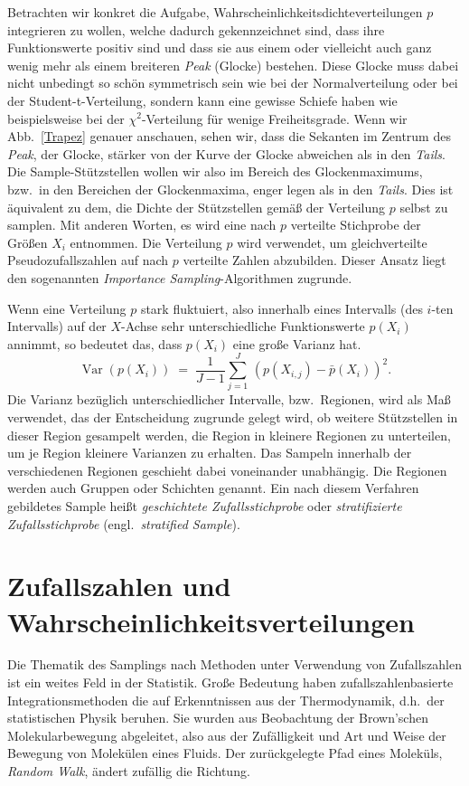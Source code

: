 Betrachten wir konkret die Aufgabe, Wahrscheinlichkeitsdichteverteilungen $p$
integrieren zu wollen, welche dadurch gekennzeichnet sind, dass ihre Funktionswerte
positiv sind und dass sie aus einem
oder vielleicht auch ganz wenig mehr als einem breiteren \textsl{Peak} (Glocke) bestehen.
Diese Glocke muss dabei nicht unbedingt so schön symmetrisch sein wie bei der 
Normalverteilung oder bei der Student-t-Verteilung, sondern kann eine gewisse Schiefe haben
wie beispielsweise bei der $\chi^2$-Verteilung für wenige Freiheitsgrade.
Wenn wir Abb.~\ref{Trapez} genauer anschauen, sehen wir, dass die Sekanten im Zentrum
des \textsl{Peak}, der Glocke, stärker von der Kurve der Glocke abweichen als in den
\textsl{Tails}. Die Sample-Stützstellen wollen wir also im Bereich des Glockenmaximums, bzw.\
in den Bereichen der Glockenmaxima, enger legen als in den \textsl{Tails}. Dies ist äquivalent
zu dem, die Dichte der Stützstellen gemäß der Verteilung $p$ selbst zu samplen.
Mit anderen Worten, es wird eine nach $p$ verteilte Stichprobe der Größen $X_i$
entnommen. Die Verteilung $p$ wird verwendet, um gleichverteilte Pseudozufallszahlen auf nach $p$
verteilte Zahlen abzubilden. 
Dieser Ansatz liegt den sogenannten \textsl{Importance Sampling}-Algorithmen zugrunde.

Wenn eine Verteilung $p$ stark fluktuiert, also innerhalb eines
Intervalls (des $i$-ten Intervalls) auf der $X$-Achse sehr unterschiedliche Funktionswerte $p(X_i)$ annimmt,
so bedeutet das, dass $p(X_i)$ eine große Varianz hat.
\begin{equation}
\operatorname{Var}(p(X_i)) \; = \; \frac{1}{J-1} \sum_{j=1}^J \, \left(p(X_{i,j})- \bar p(X_i)\right)^2 .
\end{equation}
Die Varianz bezüglich unterschiedlicher Intervalle, bzw.\ Regionen, wird als Maß verwendet,
das der Entscheidung zugrunde gelegt wird, ob weitere Stützstellen in dieser Region
gesampelt werden, die Region in kleinere Regionen zu unterteilen, um je Region kleinere Varianzen
zu erhalten.
Das Sampeln innerhalb der verschiedenen Regionen geschieht dabei
voneinander unabhängig. Die Regionen werden auch Gruppen oder Schichten genannt.
Ein nach diesem Verfahren gebildetes Sample heißt \textsl{geschichtete Zufallsstichprobe}
oder \textsl{stratifizierte Zufallsstichprobe} (engl.\ \textsl{stratified Sample}).

\section{Zufallszahlen und Wahrscheinlichkeitsverteilungen}
Die Thematik des Samplings nach Methoden unter Verwendung von Zufallszahlen ist ein
weites Feld in der Statistik. Große Bedeutung haben zufallszahlenbasierte Integrationsmethoden
die auf Erkenntnissen aus der Thermodynamik, d.h.\ der statistischen Physik beruhen.
Sie wurden aus Beobachtung der Brown'schen Molekularbewegung abgeleitet, also aus der
Zufälligkeit und Art und Weise der Bewegung von Molekülen eines Fluids.
Der zurückgelegte Pfad eines Moleküls, \textsl{Random Walk},
ändert zufällig die Richtung.

